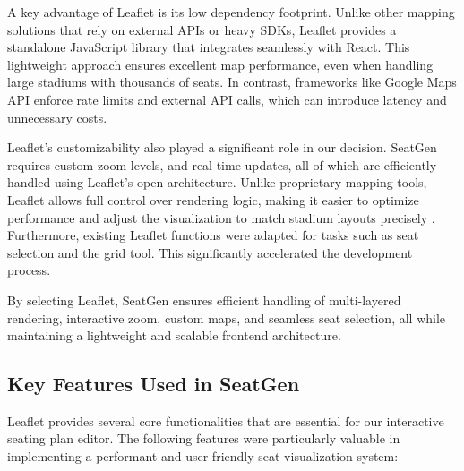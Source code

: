 A key advantage of Leaflet is its low dependency footprint. Unlike other mapping solutions that rely on external APIs or heavy SDKs, Leaflet provides a standalone JavaScript library that integrates seamlessly with React. This lightweight approach ensures excellent map performance, even when handling large stadiums with thousands of seats. In contrast, frameworks like Google Maps API enforce rate limits and external API calls, which can introduce latency and unnecessary costs.

Leaflet’s customizability also played a significant role in our decision. SeatGen requires custom zoom levels, and real-time updates, all of which are efficiently handled using Leaflet’s open architecture. Unlike proprietary mapping tools, Leaflet allows full control over rendering logic, making it easier to optimize performance and adjust the visualization to match stadium layouts precisely \cite{Leaflet}. Furthermore, existing Leaflet functions were adapted for tasks such as seat selection and the grid tool. This significantly accelerated the development process.

By selecting Leaflet, SeatGen ensures efficient handling of multi-layered rendering, interactive zoom, custom maps, and seamless seat selection, all while maintaining a lightweight and scalable frontend architecture.

\subsection{Key Features Used in SeatGen}

Leaflet provides several core functionalities that are essential for our interactive seating plan editor. The following features were particularly valuable in implementing a performant and user-friendly seat visualization system:

